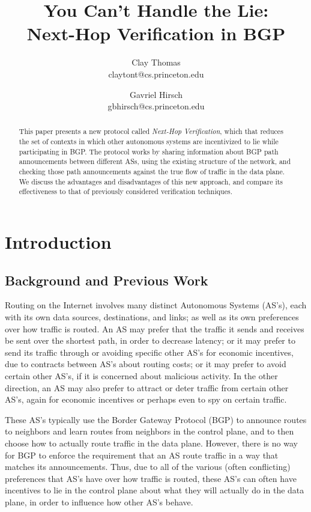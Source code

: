 \documentclass[10pt]{article}
\begin{document}

\title{
  You Can't Handle the Lie: \\
  Next-Hop Verification in BGP
}
\author{
  Clay Thomas\\ claytont@cs.princeton.edu
  \and 
  Gavriel Hirsch\\ gbhirsch@cs.princeton.edu 
}
\maketitle

\begin{abstract}
  This paper presents a new protocol called \emph{Next-Hop Verification},
  which that reduces the set of contexts in which
  other autonomous systems are incentivized to lie while participating in BGP.
  The protocol works by sharing information about BGP path announcements
  between different ASs, using the existing structure of the network,
  and checking those path announcements against the true flow of traffic
  in the data plane.
  We discuss the advantages and disadvantages of this new approach,
  and compare its effectiveness to that of previously considered verification
  techniques.
\end{abstract}

\section{Introduction}

  \subsection{Background and Previous Work}
    Routing on the Internet involves many distinct Autonomous Systems (AS's), each
    with its own data sources, destinations, and links; as well as its own
    preferences over how traffic is routed. An AS may prefer that the traffic it
    sends and receives be sent over the shortest path, in order to decrease
    latency; or it may prefer to send its traffic through or avoiding specific
    other AS's for economic incentives, due to contracts between AS's about
    routing costs; or it may prefer to avoid certain other AS's, if it is
    concerned about malicious activity. In the other direction, an AS may also
    prefer to attract or deter traffic from certain other AS's, again for economic
    incentives or perhaps even to spy on certain traffic.

    These AS's typically use the Border Gateway Protocol (BGP) to announce
    routes to neighbors and learn routes from neighbors in the control plane,
    and to then choose how to actually route traffic in the data plane. However,
    there is no way for BGP to enforce the requirement that an AS route traffic in a
    way that matches its announcements.
    Thus, due to all of the various (often conflicting)
    preferences that AS's have over how traffic is routed, these
    AS's can often have incentives to lie in the control plane about what they
    will actually do in the data plane, in order to influence how other AS's behave.
\end{document}
